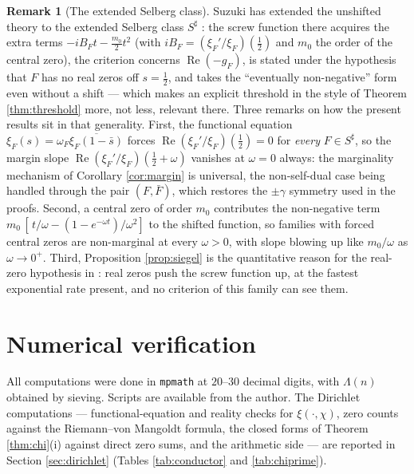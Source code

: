 \documentclass[11pt,reqno]{amsart}
\theoremstyle{plain}
\theoremstyle{definition}
\newtheorem{remark}[theorem]{Remark}
\newcommand{\Rp}{\operatorname{Re}}
\begin{document}
\begin{remark}[The extended Selberg class]\label{rem:selberg}
Suzuki has extended the unshifted theory to the extended Selberg class $S^{\sharp}$
\cite{SuzukiSelberg}: the screw function there acquires the extra terms
$-iB_Ft-\tfrac{m_0}2t^{2}$ (with $iB_F=(\xi_F'/\xi_F)(\tfrac12)$ and $m_0$ the order of the
central zero), the criterion concerns $\Rp(-g_F)$, is stated under the hypothesis that $F$ has no
real zeros off $s=\tfrac12$, and takes the ``eventually non-negative'' form even without a shift
--- which makes an explicit threshold in the style of Theorem \ref{thm:threshold} more, not less,
relevant there. Three remarks on how the present results sit in that generality. First, the
functional equation $\xi_F(s)=\omega_F\overline{\xi_F(1-\bar s)}$ forces
$\Rp(\xi_F'/\xi_F)(\tfrac12)=0$ for \emph{every} $F\in S^{\sharp}$, so the margin slope
$\Rp(\xi_F'/\xi_F)(\tfrac12+\omega)$ vanishes at $\omega=0$ always: the marginality mechanism of
Corollary \ref{cor:margin} is universal, the non-self-dual case being handled through the pair
$(F,\bar F)$, which restores the $\pm\gamma$ symmetry used in the proofs. Second, a central zero
of order $m_0$ contributes the non-negative term $m_0\,[\,t/\omega-(1-e^{-\omega t})/\omega^{2}]$
to the shifted function, so families with forced central zeros are non-marginal at every
$\omega>0$, with slope blowing up like $m_0/\omega$ as $\omega\to0^{+}$. Third, Proposition
\ref{prop:siegel} is the quantitative reason for the real-zero hypothesis in
\cite[Thm.~1.1]{SuzukiSelberg}: real zeros push the screw function up, at the fastest exponential
rate present, and no criterion of this family can see them.
\end{remark}

\section{Numerical verification}\label{sec:numerics}

All computations were done in \texttt{mpmath} at $20$--$30$ decimal digits, with $\Lambda(n)$
obtained by sieving. Scripts are available from the author. The Dirichlet computations ---
functional-equation and reality checks for $\xi(\cdot,\chi)$, zero counts against the
Riemann--von Mangoldt formula, the closed forms of Theorem \ref{thm:chi}(i) against direct zero
sums, and the arithmetic side --- are reported in Section \ref{sec:dirichlet}
(Tables \ref{tab:conductor} and \ref{tab:chiprime}).
\end{document}
